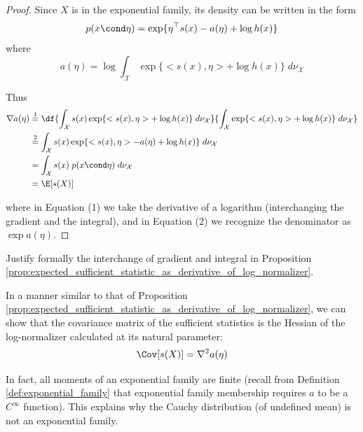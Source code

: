 \documentclass{article} %
\newcommand{\logNormalizerFunction}{a}
\newcommand{\sufficientStatsFunction}{s}
\newcommand{\carrierDensity}{h}
\begin{document}
\begin{proof}

Since $X$ is in the exponential family, its density can be written in the form
 \[ p(x \cond \eta) =  \exp \{ \eta^\top \sufficientStatsFunction(x) - \logNormalizerFunction(\eta) + \log \carrierDensity(x)\} \] 
where 
\[\logNormalizerFunction(\eta) = \log \int_{\mathcal{X}} \exp \{ <\sufficientStatsFunction(x), \eta> + \log \carrierDensity(x) \} \; d\nu_{\mathcal{X}} \] 

Thus
\begin{align*}
\nabla \logNormalizerFunction (\eta) & \stackrel{1}{=}  \df{ \int_{\mathcal{X}} \sufficientStatsFunction(x)  \exp \{ <\sufficientStatsFunction(x), \eta> + \log \carrierDensity(x) \} \; d\nu_{\mathcal{X}} }{\int_{\mathcal{X}} \exp \{ <\sufficientStatsFunction(x), \eta> + \log \carrierDensity(x) \} \; d\nu_{\mathcal{X}} } \\
& \stackrel{2}{=} \int_{\mathcal{X}} \sufficientStatsFunction(x)  \exp \{ <\sufficientStatsFunction(x), \eta> - \logNormalizerFunction(\eta) + \log \carrierDensity(x) \} \; d\nu_{\mathcal{X}}  \\
& = \int_{\mathcal{X}} \sufficientStatsFunction(x)  \; p(x \cond \eta) \; d\nu_{\mathcal{X}}  \\
&= \E[\sufficientStatsFunction(X)]
\end{align*}

where in  Equation (1) we take the derivative of a logarithm (interchanging the gradient and the integral), and in Equation (2) we recognize the denominator as $\exp \logNormalizerFunction(\eta)$.	
\end{proof}



\begin{task}
Justify formally the interchange of gradient and integral in Proposition \ref{prop:expected_sufficient_statistic_as_derivative_of_log_normalizer}.	
\end{task}

\begin{remark}
In a manner similar to that of Proposition \ref{prop:expected_sufficient_statistic_as_derivative_of_log_normalizer}, we can show that the covariance matrix of the sufficient statistics is the Hessian of the log-normalizer calculated at its natural parameter:
\[ \Cov[\sufficientStatsFunction(X)] = \nabla^2 \logNormalizerFunction(\eta) \]	

In fact, all moments of an exponential family are finite (recall from Definition \ref{def:exponential_family} that exponential family membership requires $a$ to be a $C^\infty$ function).  This explains why the Cauchy distribution (of undefined mean) is not an exponential family.
\label{rk:any_exponential_family_has_finite_moments}
\end{remark}
\end{document}
